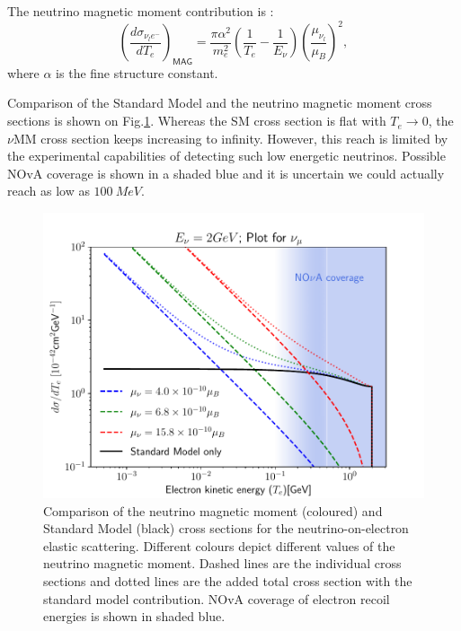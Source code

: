 The neutrino magnetic moment contribution is  \cite{nuElmagInt2015.pdf}:
\begin{equation}
\left(\frac{d\sigma_{\nu_le^-}}{dT_e}\right)_{\textsf{MAG}}=\frac{\pi\alpha^2}{m_e^2}\left(\frac{1}{T_e}-\frac{1}{E_{\nu}}\right)\left(\frac{\mu_{\nu_l}}{\mu_B}\right)^2,
\end{equation}
where $\alpha$ is the fine structure constant.

Comparison of the Standard Model and the neutrino magnetic moment cross sections is shown on Fig.\ref{fig:NuMMCrossSectionComparison}. Whereas the SM cross section is flat with $T_e\rightarrow 0$, the $\nu$MM cross section keeps increasing to infinity. However, this reach is limited by the experimental capabilities of detecting such low energetic neutrinos. Possible NOvA coverage is shown in a shaded blue and it is uncertain we could actually reach as low as $100\ \unit{MeV}$.


\begin{figure}[hbtp]
\centering
\includegraphics[width=.7\textwidth]{Plots/NuMM/dSdTNumuMMCompAltLim.pdf}
\caption{Comparison of the neutrino magnetic moment (coloured) and Standard Model (black) cross sections for the neutrino-on-electron elastic scattering. Different colours depict different values of the neutrino magnetic moment. Dashed lines are the individual cross sections and dotted lines are the added total cross section with the standard model contribution. NOvA coverage of electron recoil energies is shown in shaded blue.}
\label{fig:NuMMCrossSectionComparison}
\end{figure}

